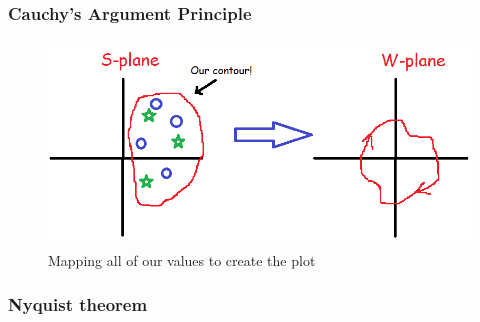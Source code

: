 \begin{newtext}
\subsubsection{Cauchy's Argument Principle}



\begin{figure}[h!]
    \centering
    \includegraphics[scale= 0.4]{Images/sw.PNG}
    \caption{Mapping all of our values to create the plot}
    \label{Cauchy}
\end{figure}


\subsubsection{Nyquist theorem}


\end{newtext}
